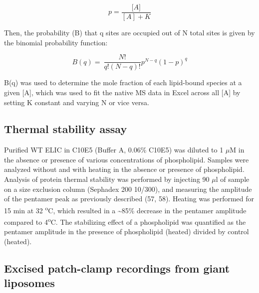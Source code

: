 \begin{equation}
p = \frac{\lbrack A\rbrack}{\left\lbrack A \right\rbrack + K}
\end{equation}

Then, the probability (B) that q sites are occupied out of N total sites
is given by the binomial probability function:

\begin{equation}
B\left( q \right) = \ \frac{N!}{q!\left( N - q \right)!}p^{N - q}{(1 - p)}^{q}
\end{equation}

B(q) was used to determine the mole fraction of each lipid-bound species
at a given {[}A{]}, which was used to fit the native MS data in Excel
across all {[}A{]} by setting K constant and varying N or vice versa.

\subsection{Thermal stability assay}

Purified WT ELIC in C10E5 (Buffer A, 0.06\% C10E5) was diluted to 1 $\mu$M
in the absence or presence of various concentrations of phospholipid.
Samples were analyzed without and with heating in the absence or
presence of phospholipid. Analysis of protein thermal stability was
performed by injecting 90 $\mu$l of sample on a size exclusion column
(Sephadex 200 10/300), and measuring the amplitude of the pentamer peak
as previously described (57, 58). Heating was performed for 15 min at 32
\textsuperscript{o}C, which resulted in a \textasciitilde{}85\% decrease
in the pentamer amplitude compared to 4\textsuperscript{o}C. The
stabilizing effect of a phospholipid was quantified as the pentamer
amplitude in the presence of phospholipid (heated) divided by control
(heated).

\subsection{Excised patch-clamp recordings from giant liposomes}

